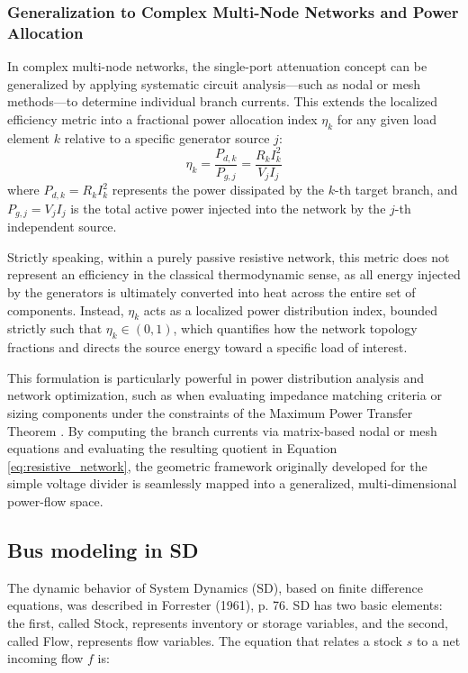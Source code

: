 \documentclass[energies,accept,oneauthor,pdftex]{Definitions/mdpi}
\begin{document}
\subsubsection{Generalization to Complex Multi-Node Networks and Power Allocation}
In complex multi-node networks, the single-port attenuation concept can be generalized by applying systematic circuit analysis—such as nodal or mesh methods—to determine individual branch currents. This extends the localized efficiency metric into a fractional power allocation index $\eta_{k}$ for any given load element $k$ relative to a specific generator source $j$:
\begin{equation}
\eta_k = \frac{P_{d,k}}{P_{g,j}} = \frac{R_k I_k^2}{V_j I_j}
\label{eq:resistive_network}
\end{equation}
where $P_{d,k} = R_k I_k^2$ represents the power dissipated by the $k$-th target branch, and $P_{g,j} = V_j I_j$ is the total active power injected into the network by the $j$-th independent source.

Strictly speaking, within a purely passive resistive network, this metric does not represent an efficiency in the classical thermodynamic sense, as all energy injected by the generators is ultimately converted into heat across the entire set of components. Instead, $\eta_k$ acts as a localized power distribution index, bounded strictly such that $\eta_k \in (0, 1)$, which quantifies how the network topology fractions and directs the source energy toward a specific load of interest.

This formulation is particularly powerful in power distribution analysis and network optimization, such as when evaluating impedance matching criteria or sizing components under the constraints of the Maximum Power Transfer Theorem \cite{alexander2021fundamentals}. By computing the branch currents via matrix-based nodal or mesh equations and evaluating the resulting quotient in Equation \ref{eq:resistive_network}, the geometric framework originally developed for the simple voltage divider is seamlessly mapped into a generalized, multi-dimensional power-flow space.



\subsection{Bus modeling in SD}

The dynamic behavior of System Dynamics (SD), based on finite difference equations, was described in Forrester (1961), p. 76. SD has two basic elements: the first, called Stock, represents inventory or storage variables, and the second, called Flow, represents flow variables. The equation that relates a stock $s$ to a net incoming flow $f$ is:
\end{document}
